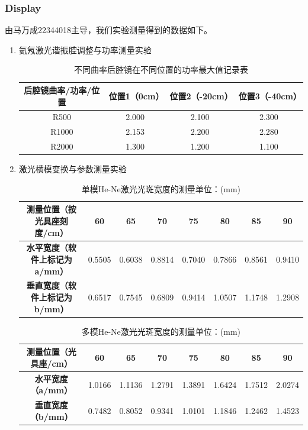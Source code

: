 \subsubsection{Display}
由马万成22344018主导，我们实验测量得到的数据如下。
\begin{enumerate}
	\item 氦氖激光谐振腔调整与功率测量实验
	
	\begin{table}[h!]
		\centering
		\renewcommand{\arraystretch}{1.5} %
		\caption{不同曲率后腔镜在不同位置的功率最大值记录表}
		\label{tab:exp1}
		\begin{tabular}{|c|c|c|c|}
			\hline
			\textbf{后腔镜曲率/功率/位置} & \textbf{位置1（0cm）} & \textbf{位置2（-20cm）} & \textbf{位置3（-40cm）} \\ \hline
			R500 & 2.000 & 2.100 & 2.300 \\ \hline
			R1000 & 2.153 & 2.200 & 2.280 \\ \hline
			R2000 & 1.300 & 1.200 & 1.100 \\ \hline
		\end{tabular}
	\end{table}
	
	\item 激光横模变换与参数测量实验
	
	\begin{table}[htbp]
		\centering
		\renewcommand{\arraystretch}{1.5} %
		\caption{单模He-Ne激光光斑宽度的测量\quad 单位：(mm)}
		\label{tab:exp2-1}
		\begin{tabular}{|c|c|c|c|c|c|c|c|}
			\hline
			\textbf{测量位置（按光具座刻度/cm）} & \textbf{60} & \textbf{65} & \textbf{70} & \textbf{75} & \textbf{80} & \textbf{85} & \textbf{90} \\ \hline
			\textbf{水平宽度（软件上标记为a/mm）} & 0.5505 & 0.6038 & 0.8814 & 0.7040 & 0.7866 & 0.8561 & 0.9410 \\ \hline
			\textbf{垂直宽度（软件上标记为b/mm）} & 0.6517 & 0.7545 & 0.6809 & 0.9414 & 1.0507 & 1.1748 & 1.2908 \\ \hline
		\end{tabular}
	\end{table}
	
	\begin{table}[htbp]
		\centering
		\renewcommand{\arraystretch}{1.5} %
		\caption{多模He-Ne激光光斑宽度的测量\quad 单位：(mm)}
		\label{tab:exp2-2}
		\begin{tabular}{|c|c|c|c|c|c|c|c|}
			\hline
			\textbf{测量位置（光具座/cm）} & \textbf{60} & \textbf{65} & \textbf{70} & \textbf{75} & \textbf{80} & \textbf{85} & \textbf{90} \\ \hline
			\textbf{水平宽度（a/mm）} & 1.0166 & 1.1136 & 1.2791 & 1.3891 & 1.6424 & 1.7512 & 2.0274 \\ \hline
			\textbf{垂直宽度（b/mm）} & 0.7482 & 0.8052 & 0.9341 & 1.0101 & 1.1846 & 1.2462 & 1.4523 \\ \hline
		\end{tabular}
	\end{table}
	

\end{enumerate}
